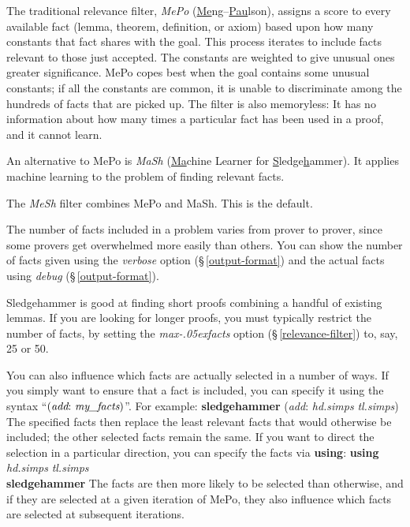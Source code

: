\documentclass[a4paper,12pt]{article}
\let\oldS=\S
\def\S{\oldS\,}
\renewcommand\_{\hbox{\textunderscore\kern-.05ex}}
\begin{document}
\begin{enum}
\item[\labelitemi]
The traditional relevance filter, \emph{MePo}
(\underline{Me}ng--\underline{Pau}lson), assigns a score to every available
fact (lemma, theorem, definition, or axiom) based upon how many constants that
fact shares with the goal. This process iterates to include facts
relevant to those just accepted. The constants are weighted to give unusual
ones greater significance. MePo copes best when the goal contains some
unusual constants; if all the constants are common, it is unable to
discriminate among the hundreds of facts that are picked up. The filter is also
memoryless: It has no information about how many times a particular fact has
been used in a proof, and it cannot learn.

\item[\labelitemi]
An alternative to MePo is \emph{MaSh} (\underline{Ma}chine Learner for
\underline{S}ledge\underline{h}ammer). It applies machine learning to the
problem of finding relevant facts.

\item[\labelitemi] The \emph{MeSh} filter combines MePo and MaSh. This is
the default.
\end{enum}

The number of facts included in a problem varies from prover to prover, since
some provers get overwhelmed more easily than others. You can show the number of
facts given using the \textit{verbose} option (\S\ref{output-format}) and the
actual facts using \textit{debug} (\S\ref{output-format}).

Sledgehammer is good at finding short proofs combining a handful of existing
lemmas. If you are looking for longer proofs, you must typically restrict the
number of facts, by setting the \textit{max\_facts} option
(\S\ref{relevance-filter}) to, say, 25 or 50.

You can also influence which facts are actually selected in a number of ways. If
you simply want to ensure that a fact is included, you can specify it using the
syntax ``$(\textit{add}{:}~\textit{my\_facts})$''. For example:
%
\prew
\textbf{sledgehammer} (\textit{add}: \textit{hd.simps} \textit{tl.simps})
\postw
%
The specified facts then replace the least relevant facts that would otherwise be
included; the other selected facts remain the same.
If you want to direct the selection in a particular direction, you can specify
the facts via \textbf{using}:
%
\prew
\textbf{using} \textit{hd.simps} \textit{tl.simps} \\
\textbf{sledgehammer}
\postw
%
The facts are then more likely to be selected than otherwise, and if they are
selected at a given iteration of MePo, they also influence which facts are
selected at subsequent iterations.
\end{document}
